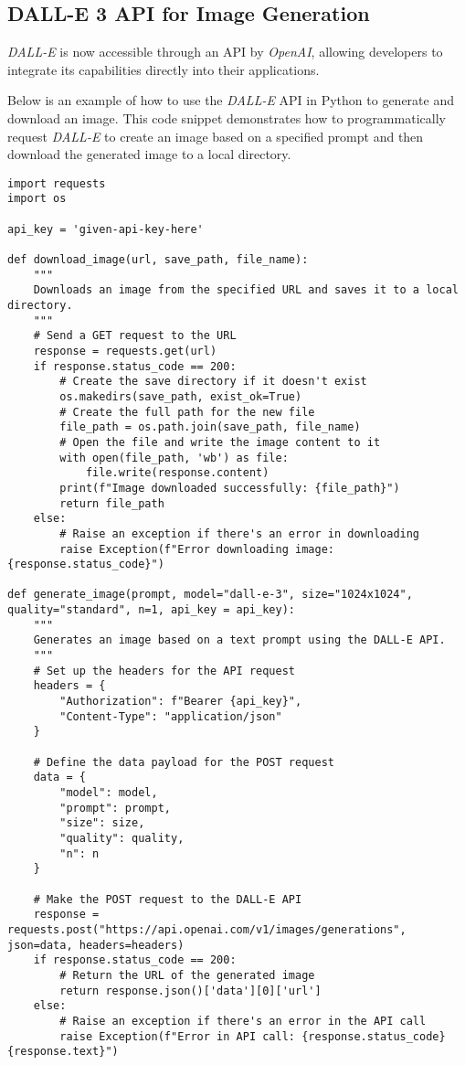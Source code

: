 \subsection{DALL-E 3 API for Image Generation}
\label{subsec:dalle-api}

\textit{DALL-E} is now accessible through an API by \textit{OpenAI}, allowing developers to integrate its capabilities directly into their applications.

Below is an example of how to use the \textit{DALL-E} API in Python to generate and download an image. This code snippet demonstrates how to programmatically request \textit{DALL-E} to create an image based on a specified prompt and then download the generated image to a local directory.
\begin{lstlisting}
import requests
import os

api_key = 'given-api-key-here'

def download_image(url, save_path, file_name):
    """
    Downloads an image from the specified URL and saves it to a local directory.
    """
    # Send a GET request to the URL
    response = requests.get(url)
    if response.status_code == 200:
        # Create the save directory if it doesn't exist
        os.makedirs(save_path, exist_ok=True)
        # Create the full path for the new file
        file_path = os.path.join(save_path, file_name)
        # Open the file and write the image content to it
        with open(file_path, 'wb') as file:
            file.write(response.content)
        print(f"Image downloaded successfully: {file_path}")
        return file_path
    else:
        # Raise an exception if there's an error in downloading
        raise Exception(f"Error downloading image: {response.status_code}")

def generate_image(prompt, model="dall-e-3", size="1024x1024", quality="standard", n=1, api_key = api_key):
    """
    Generates an image based on a text prompt using the DALL-E API.
    """
    # Set up the headers for the API request
    headers = {
        "Authorization": f"Bearer {api_key}",
        "Content-Type": "application/json"
    }

    # Define the data payload for the POST request
    data = {
        "model": model,
        "prompt": prompt,
        "size": size,
        "quality": quality,
        "n": n
    }

    # Make the POST request to the DALL-E API
    response = requests.post("https://api.openai.com/v1/images/generations", json=data, headers=headers)
    if response.status_code == 200:
        # Return the URL of the generated image
        return response.json()['data'][0]['url']
    else:
        # Raise an exception if there's an error in the API call
        raise Exception(f"Error in API call: {response.status_code} {response.text}")


\end{lstlisting}
